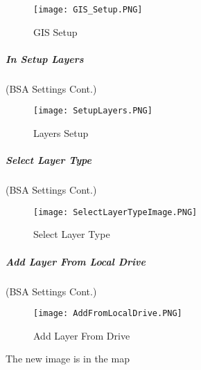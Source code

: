 \documentclass[class=article , crop=false, titlepage, twoside, multi={itemize, figure, verbatim}, float=false]{standalone}
\begin{document}
%
%
\begin{figure}[h!]
\centering
    \texttt{[image: GIS\_Setup.PNG]}
\caption{GIS Setup}
\end{figure}
\clearpage
%
%
%
\subparagraph[Layers Setup ]{\Large In Setup Layers\texorpdfstring{\\}{}}
(BSA Settings Cont.)
\vspace{.75in}

\vspace{.5in}
%
%
\begin{figure}[h!]
\centering
    \texttt{[image: SetupLayers.PNG]}
\caption{Layers Setup}
\end{figure}
\clearpage
%
%
%
\subparagraph[Select Layer Type ]{\Large Select Layer Type\texorpdfstring{\\}{}}
(BSA Settings Cont.)
\vspace{.75in}

\vspace{.5in}
%
%
\begin{figure}[h!]
\centering
    \texttt{[image: SelectLayerTypeImage.PNG]}
\caption{Select Layer Type}
\end{figure}
\clearpage
%
%
%
\subparagraph[Add Layer From Local Drive]{\Large Add Layer From Local Drive\texorpdfstring{\\}{}}
(BSA Settings Cont.)
\vspace{.75in}

\vspace{.5in}

%
%
\begin{figure}[h!]
\centering
    \texttt{[image: AddFromLocalDrive.PNG]}
\caption{Add Layer From Drive}
\end{figure}
{\Large The new image is in the map}
\clearpage
\end{document}
